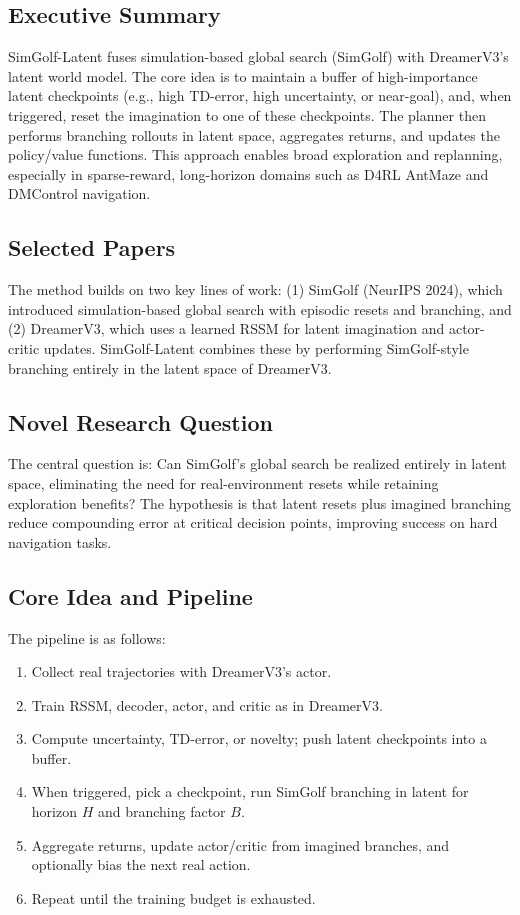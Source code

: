 \documentclass{article}
\begin{document}
\subsection{Executive Summary}
SimGolf-Latent fuses simulation-based global search (SimGolf) with DreamerV3’s latent world model. The core idea is to maintain a buffer of high-importance latent checkpoints (e.g., high TD-error, high uncertainty, or near-goal), and, when triggered, reset the imagination to one of these checkpoints. The planner then performs branching rollouts in latent space, aggregates returns, and updates the policy/value functions. This approach enables broad exploration and replanning, especially in sparse-reward, long-horizon domains such as D4RL AntMaze and DMControl navigation.

\subsection{Selected Papers}
The method builds on two key lines of work: (1) SimGolf (NeurIPS 2024), which introduced simulation-based global search with episodic resets and branching, and (2) DreamerV3, which uses a learned RSSM for latent imagination and actor-critic updates. SimGolf-Latent combines these by performing SimGolf-style branching entirely in the latent space of DreamerV3.

\subsection{Novel Research Question}
The central question is: Can SimGolf’s global search be realized entirely in latent space, eliminating the need for real-environment resets while retaining exploration benefits? The hypothesis is that latent resets plus imagined branching reduce compounding error at critical decision points, improving success on hard navigation tasks.

\subsection{Core Idea and Pipeline}
The pipeline is as follows:
\begin{enumerate}
\item Collect real trajectories with DreamerV3’s actor.
\item Train RSSM, decoder, actor, and critic as in DreamerV3.
\item Compute uncertainty, TD-error, or novelty; push latent checkpoints into a buffer.
\item When triggered, pick a checkpoint, run SimGolf branching in latent for horizon $H$ and branching factor $B$.
\item Aggregate returns, update actor/critic from imagined branches, and optionally bias the next real action.
\item Repeat until the training budget is exhausted.
\end{enumerate}
\end{document}
